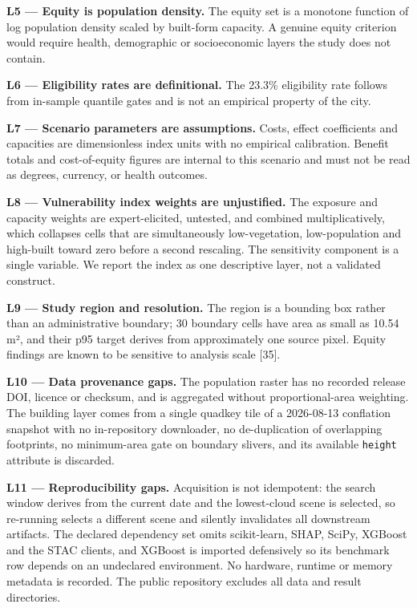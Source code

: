 \documentclass[conference]{IEEEtran}
\begin{document}
\textbf{L5 --- Equity is population density.} The equity set is a monotone function of log population
density scaled by built-form capacity. A genuine equity criterion would require health, demographic
or socioeconomic layers the study does not contain.

\textbf{L6 --- Eligibility rates are definitional.} The 23.3\% eligibility rate follows from in-sample
quantile gates and is not an empirical property of the city.

\textbf{L7 --- Scenario parameters are assumptions.} Costs, effect coefficients and capacities are
dimensionless index units with no empirical calibration. Benefit totals and cost-of-equity figures
are internal to this scenario and must not be read as degrees, currency, or health outcomes.

\textbf{L8 --- Vulnerability index weights are unjustified.} The exposure and capacity weights are
expert-elicited, untested, and combined multiplicatively, which collapses cells that are simultaneously
low-vegetation, low-population and high-built toward zero before a second rescaling. The sensitivity
component is a single variable. We report the index as one descriptive layer, not a validated
construct.

\textbf{L9 --- Study region and resolution.} The region is a bounding box rather than an administrative
boundary; 30 boundary cells have area as small as 10.54 m², and their p95 target derives from
approximately one source pixel. Equity findings are known to be sensitive to analysis scale {[}35{]}.

\textbf{L10 --- Data provenance gaps.} The population raster has no recorded release DOI, licence or
checksum, and is aggregated without proportional-area weighting. The building layer comes from a
single quadkey tile of a 2026-08-13 conflation snapshot with no in-repository downloader, no
de-duplication of overlapping footprints, no minimum-area gate on boundary slivers, and its available
\texttt{height} attribute is discarded.

\textbf{L11 --- Reproducibility gaps.} Acquisition is not idempotent: the search window derives from the
current date and the lowest-cloud scene is selected, so re-running selects a different scene and
silently invalidates all downstream artifacts. The declared dependency set omits scikit-learn, SHAP,
SciPy, XGBoost and the STAC clients, and XGBoost is imported defensively so its benchmark row depends
on an undeclared environment. No hardware, runtime or memory metadata is recorded. The public
repository excludes all data and result directories.
\end{document}
